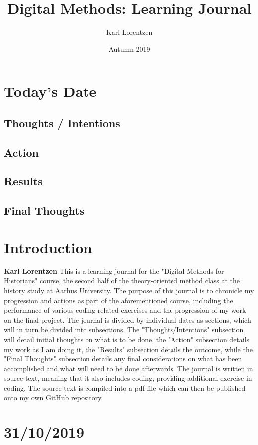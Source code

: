 \documentclass{article}
\title{Digital Methods: Learning Journal}
\author{Karl Lorentzen}
\date{Autumn 2019}
\begin{document}
\maketitle

\section{Today's Date}
\subsection{Thoughts / Intentions}
\subsection{Action}
\subsection{Results}
\subsection{Final Thoughts}

\pagebreak{}

\section{Introduction}
\textbf{Karl Lorentzen} This is a learning journal for the "Digital Methods for Historians" course, the second half of the theory-oriented method class at the history study at Aarhus University. The purpose of this journal is to chronicle my progression and actions as part of the aforementioned course, including the performance of various coding-related exercises and the progression of my work on the final project. The journal is divided by individual dates as sections, which will in turn be divided into subsections. The "Thoughts/Intentions" subsection will detail initial thoughts on what is to be done, the "Action" subsection details my work as I am doing it, the "Results" subsection details the outcome, while the "Final Thoughts" subsection details any final considerations on what has been accomplished and what will need to be done afterwards. The journal is written in source text, meaning that it also includes coding, providing additional exercise in coding. The source text is compiled into a pdf file which can then be published onto my own GitHub repository.

\section{31/10/2019}
\end{document}
